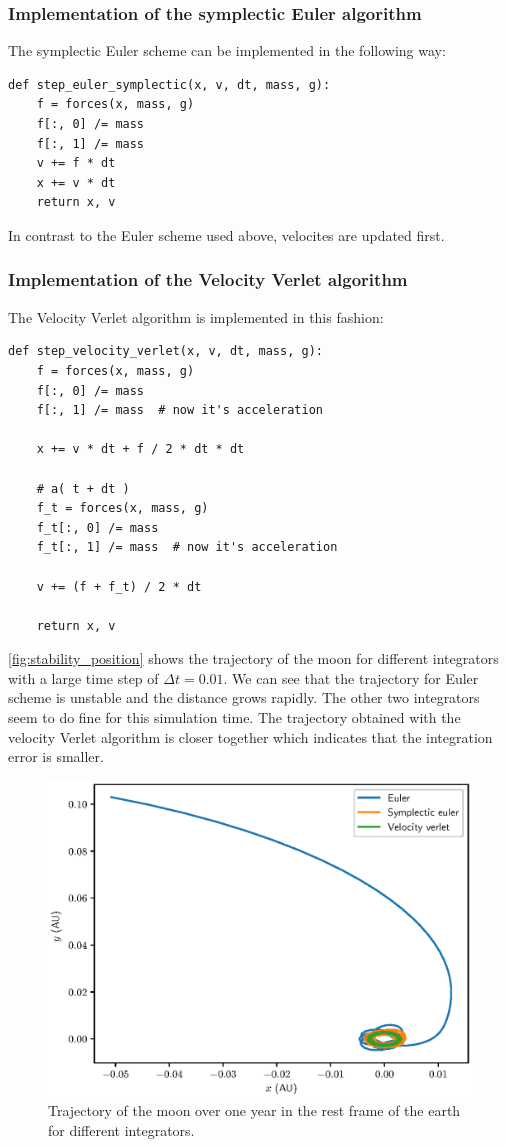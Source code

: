 \documentclass[a4paper,10pt,bibtotoc]{scrartcl}
\begin{document}
\subsubsection{Implementation of the symplectic Euler algorithm}
The symplectic Euler scheme can be implemented in the following way:
\begin{lstlisting}
def step_euler_symplectic(x, v, dt, mass, g):
    f = forces(x, mass, g)
    f[:, 0] /= mass
    f[:, 1] /= mass
    v += f * dt
    x += v * dt
    return x, v 
\end{lstlisting}
In contrast to the Euler scheme used above, velocites are updated first.

\subsubsection{Implementation of the Velocity Verlet algorithm}
The Velocity Verlet algorithm is implemented in this fashion:
\begin{lstlisting}
def step_velocity_verlet(x, v, dt, mass, g):
    f = forces(x, mass, g)
    f[:, 0] /= mass
    f[:, 1] /= mass  # now it's acceleration

    x += v * dt + f / 2 * dt * dt

    # a( t + dt )
    f_t = forces(x, mass, g)
    f_t[:, 0] /= mass
    f_t[:, 1] /= mass  # now it's acceleration

    v += (f + f_t) / 2 * dt

    return x, v
\end{lstlisting}

\autoref{fig:stability_position} shows the trajectory of the moon for different integrators with a large time step of $\Delta t = 0.01$. 
We can see that the trajectory for Euler scheme is unstable and the distance grows rapidly. 
The other two integrators seem to do fine for this simulation time.
The trajectory obtained with the velocity Verlet algorithm is closer together which indicates that the integration error is smaller.


\begin{figure}[h]
\centering
 \includegraphics[width=\textwidth]{stability_position.eps}
 \caption{Trajectory of the moon over one year in the rest frame of the earth for different integrators.}
 \label{fig:stability_position}
\end{figure}
\end{document}
